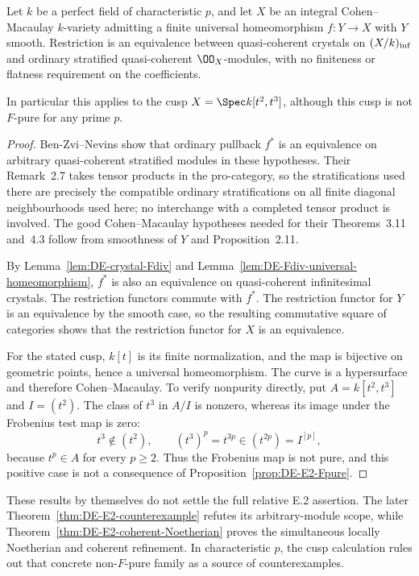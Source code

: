 \begin{proposition}\label{prop:DE-E2-cusps}
Let $k$ be a perfect field of characteristic $p$, and let $X$ be an integral Cohen--Macaulay $k$-variety admitting a finite universal homeomorphism $f:Y\to X$ with $Y$ smooth.  Restriction is an equivalence between quasi-coherent crystals on $(X/k)_{\rm inf}$ and ordinary stratified quasi-coherent $\OO_X$-modules, with no finiteness or flatness requirement on the coefficients.

In particular this applies to the cusp $X=\Spec k[t^2,t^3]$, although this cusp is not $F$-pure for any prime $p$.
\end{proposition}
\begin{proof}
Ben-Zvi--Nevins \cite[Proposition~2.11, Theorem~3.11, Theorem~4.3 and Remark~4.5]{BenZviNevins2004} show that ordinary pullback $f^*$ is an equivalence on arbitrary quasi-coherent stratified modules in these hypotheses.  Their Remark~2.7 takes tensor products in the pro-category, so the stratifications used there are precisely the compatible ordinary stratifications on all finite diagonal neighbourhoods used here; no interchange with a completed tensor product is involved.  The good Cohen--Macaulay hypotheses needed for their Theorems~3.11 and~4.3 follow from smoothness of $Y$ and Proposition~2.11.

By Lemma~\ref{lem:DE-crystal-Fdiv} and Lemma~\ref{lem:DE-Fdiv-universal-homeomorphism}, $f^*$ is also an equivalence on quasi-coherent infinitesimal crystals.  The restriction functors commute with $f^*$.  The restriction functor for $Y$ is an equivalence by the smooth case, so the resulting commutative square of categories shows that the restriction functor for $X$ is an equivalence.

For the stated cusp, $k[t]$ is its finite normalization, and the map is bijective on geometric points, hence a universal homeomorphism.  The curve is a hypersurface and therefore Cohen--Macaulay.  To verify nonpurity directly, put $A=k[t^2,t^3]$ and $I=(t^2)$.  The class of $t^3$ in $A/I$ is nonzero, whereas its image under the Frobenius test map is zero:
\[
       t^3\notin(t^2),\qquad
       (t^3)^p=t^{3p}\in(t^{2p})=I^{[p]},
\]
because $t^p\in A$ for every $p\geq2$.  Thus the Frobenius map is not pure, and this positive case is not a consequence of Proposition~\ref{prop:DE-E2-Fpure}.
\end{proof}

These results by themselves do not settle the full relative E.2 assertion.  The later Theorem~\ref{thm:DE-E2-counterexample} refutes its arbitrary-module scope, while Theorem~\ref{thm:DE-E2-coherent-Noetherian} proves the simultaneous locally Noetherian and coherent refinement.  In characteristic $p$, the cusp calculation rules out that concrete non-$F$-pure family as a source of counterexamples.
